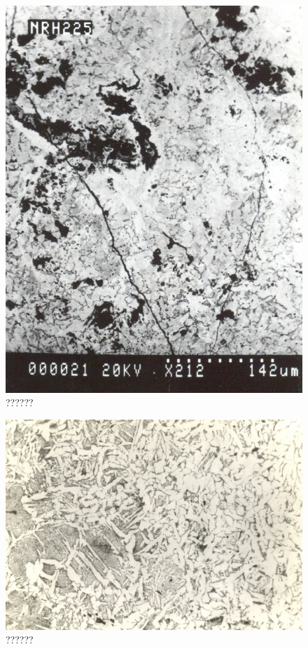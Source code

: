 \begin{figure}[H]
\renewcommand{\thefigure}{26D}
\includegraphics[scale=0.70]{images/chapter-4/fig026D.jpg}
\caption{??????}\label{chapter-4-fig26D}
\end{figure}

\begin{figure}[H]
\renewcommand{\thefigure}{27A}
\includegraphics[scale=0.65]{images/chapter-4/fig027A.jpg}
\caption{??????}\label{chapter-4-fig27A}
\end{figure}

